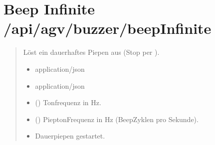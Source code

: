 \documentclass[letterpaper,10pt,english]{sphinxmanual}
\begin{document}
\section{Beep Infinite \sphinxhyphen{} /api/agv/buzzer/beepInfinite}
\label{\detokenize{agv_rest_api_buzzer:beep-infinite-api-agv-buzzer-beepinfinite}}\label{\detokenize{agv_rest_api_buzzer:post-api-agv-buzzer-beepinfinite}}

\begin{fulllineitems}
\label{\detokenize{agv_rest_api_buzzer:post--api-agv-buzzer-beepInfinite}}
\pysigstartsignatures
\pysigline
{}
\pysigstopsignatures\begin{quote}\begin{description}
\sphinxAtStartPar
Löst ein dauerhaftes Piepen aus (Stop per ).

\begin{itemize}
\item {} 
\sphinxAtStartPar
{} \textendash{} application/json

\end{itemize}

\begin{itemize}
\item {} 
\sphinxAtStartPar
{} \textendash{} application/json

\end{itemize}

\begin{itemize}
\item {} 
\sphinxAtStartPar
{} () \textendash{} Tonfrequenz in Hz.

\item {} 
\sphinxAtStartPar
{} () \textendash{} Piepton\sphinxhyphen{}Frequenz in Hz (Beep\sphinxhyphen{}Zyklen pro Sekunde).

\end{itemize}

\begin{itemize}
\item {} 
\sphinxAtStartPar
{} \textendash{} Dauerpiepen gestartet.


\end{itemize}
\end{description}
\end{quote}
\end{fulllineitems}
\end{document}
